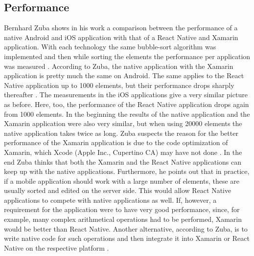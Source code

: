\documentclass[Bachelor,BIF,english]{twbook}
\begin{document}
\subsection{Performance}
Bernhard Zuba shows in his work \cite{ZubaBernhard2017EdPb} a comparison between the performance of a native Android and iOS application with that of a React Native and Xamarin application. With each technology the same bubble-sort algorithm was implemented and then while sorting the elements the performance per application was measured \cite[p.~30]{ZubaBernhard2017EdPb}. According to Zuba, the native application with the Xamarin application is pretty much the same on Android. The same applies to the React Native application up to 1000 elements, but their performance drops sharply thereafter \cite[p.~30]{ZubaBernhard2017EdPb}. The measurements in the iOS applications give a very similar picture as before. Here, too, the performance of the React Native application drops again from 1000 elements. In the beginning the results of the native application and the Xamarin application were also very similar, but when using 20000 elements the native application takes twice as long. Zuba suspects the reason for the better performance of the Xamarin application is due to the code optimization of Xamarin, which Xcode (Apple Inc., Cupertino CA) may have not done \cite[p.~31]{ZubaBernhard2017EdPb}. In the end Zuba thinks that both the Xamarin and the React Native applications can keep up with the native applications. Furthermore, he points out that in practice, if a mobile application should work with a large number of elements, these are usually sorted and edited on the server side. This would allow React Native applications to compete with native applications as well. If, however, a requirement for the application were to have very good performance, since, for example, many complex arithmetical operations had to be performed, Xamarin would be better than React Native. Another alternative, according to Zuba, is to write native code for such operations and then integrate it into Xamarin or React Native on the respective platform \cite[p.~32]{ZubaBernhard2017EdPb}.
\end{document}
